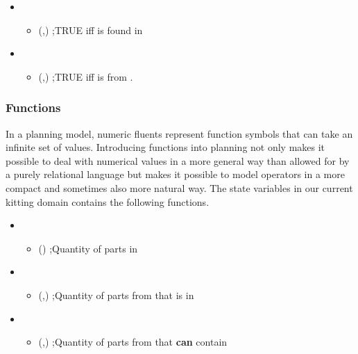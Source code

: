 \begin{itemize}
\item {}
  \begin{itemize}
    \item {}(,) ;TRUE iff  is found in 
  \end{itemize}

\item {}
  \begin{itemize}
    \item {}(,) ;TRUE iff  is from .
  \end{itemize}
\end{itemize}

\subsubsection{Functions}
In a planning model, numeric fluents represent function symbols that can take an infinite
set of values. Introducing functions into planning not only makes it possible to deal with numerical
values in a more general way than allowed for by a purely relational language but makes it possible to model operators in a more compact and sometimes also more natural way. The state variables in our current kitting domain contains the following functions.

\begin{itemize}
 \item {}
  \begin{itemize}
   \item {}() ;Quantity of parts in 
  \end{itemize}

 \item {}
  \begin{itemize}
   \item {}(,) ;Quantity of parts from  that is in 
  \end{itemize}

     \item {}
  \begin{itemize}
  \item {}(,) ;Quantity of parts from  that  \textbf{can} contain
  \end{itemize}
\end{itemize}


